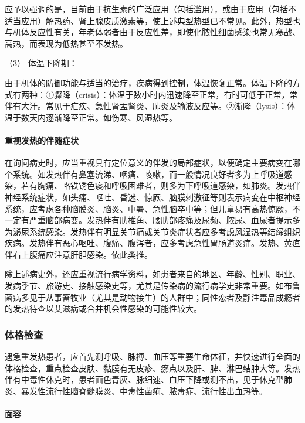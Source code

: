 应予以强调的是，目前由于抗生素的广泛应用（包括滥用），或由于应用（包括不适当应用）解热药、肾上腺皮质激素等，使上述典型热型已不常见。此外，热型也与机体反应性有关，年老体弱者由于反应性差，即使化脓性细菌感染也常无寒战、高热，而表现为低热甚至不发热。

\hypertarget{text00008.htmlux5cux23CHP1-1-2-1-2-3}{}
（3） 体温下降期：

由于机体的防御功能与适当的治疗，疾病得到控制，体温恢复正常。体温下降的方式有两种：①骤降（crisis）：体温于数小时内迅速降至正常，有时可低于正常，常伴有大汗。常见于疟疾、急性肾盂肾炎、肺炎及输液反应等。②渐降（lysis）：体温于数天内逐渐降至正常。如伤寒、风湿热等。

\paragraph{重视发热的伴随症状}

在询问病史时，应当重视具有定位意义的伴发的局部症状，以便确定主要病变在哪个系统。如发热伴有鼻塞流涕、咽痛、咳嗽，而一般情况良好者多为上呼吸道感染，若有胸痛、咯铁锈色痰和呼吸困难者，则多为下呼吸道感染，如肺炎。发热伴神经系统症状，如头痛、呕吐、昏迷、惊厥、脑膜刺激征等则表示病变在中枢神经系统，应考虑各种脑膜炎、脑炎、中暑、急性脑卒中等；但儿童易有高热惊厥，不一定有严重脑部病变。发热伴有肋椎角、腰肋部疼痛及尿频、脓尿、血尿者提示多为泌尿系统感染。发热伴有明显关节痛或关节炎症状者应多考虑风湿热等结缔组织疾病。发热伴有恶心呕吐、腹痛、腹泻者，应多考虑急性胃肠道炎症。发热、黄疸伴右上腹痛应注意肝胆感染。依此类推。

除上述病史外，还应重视流行病学资料，如患者来自的地区、年龄、性别、职业、发病季节、旅游史、接触感染史等，尤其是传染病的流行病学史非常重要。如布鲁菌病多见于从事畜牧业（尤其是动物接生）的人群中；同性恋者及静注毒品成瘾者的发热待查以艾滋病或合并机会性感染的可能性较大。

\subsubsection{体格检查}

遇急重发热患者，应首先测呼吸、脉搏、血压等重要生命体征，并快速进行全面的体格检查，重点检查皮肤、黏膜有无皮疹、瘀点以及肝、脾、淋巴结肿大等。发热伴有中毒性休克时，患者面色青灰、脉细速、血压下降或测不出，见于休克型肺炎、暴发性流行性脑脊髓膜炎、中毒性菌痢、脓毒症、流行性出血热等。

\paragraph{面容}

